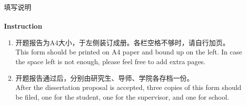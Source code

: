 \documentclass[a4paper,zihao=-4,AutoFakeBold]{ctexart}
\begin{document}
\clearpage


\begin{center}
    \vspace*{-0.5cm}
    {\heiti 填\quad 写\quad 说\quad 明}\\~\\
    \vspace*{-0.5ex}
    {\bfseries Instruction}
\end{center}

\vspace*{0.3ex}
\setlength{\leftmargini}{21pt}
\begin{enumerate}[1、]
    \fangsong
    \item 开题报告为A4大小，于左侧装订成册。各栏空格不够时，请自行加页。
          \\[0.5\baselineskip]
          This form should be printed on A4 paper and bound up on the left. In case the space 
          left is not enough, please feel free to add extra pages.

    \vspace{3\baselineskip}
    \vspace{-0.3ex}

    \item 开题报告通过后，分别由研究生、导师、学院各存档一份。
          \\[0.5\baselineskip]
          After the dissertation proposal is accepted, three copies of this form should be filed, 
          one for the student, one for the supervisor, and one for school.

\end{enumerate}

\clearpage

\fangsong\linespread{1.09}\selectfont %
\end{document}
